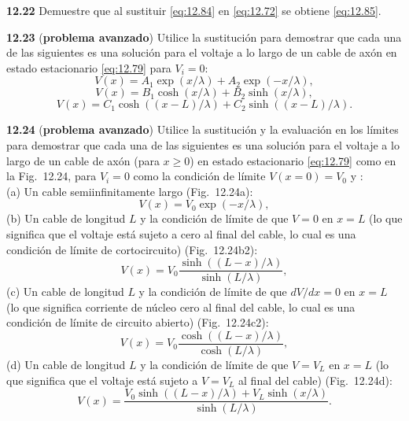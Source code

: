 \documentclass[12pt]{book}
\begin{document}
\noindent \textbf{12.22} Demuestre que al sustituir \eqref{eq:12.84} en \eqref{eq:12.72} se obtiene \eqref{eq:12.85}.

\noindent \textbf{12.23} (\textbf{problema avanzado}) Utilice la sustitución para demostrar que cada una de las siguientes es una solución para el voltaje a lo largo de un cable de axón en estado estacionario \eqref{eq:12.79} para $V_i = 0$:
\begin{equation}
V(x) = A_1 \exp(x/\lambda) + A_2 \exp(-x/\lambda),
\label{eq:12.96}
\end{equation}
\begin{equation}
V(x) = B_1 \cosh(x/\lambda) + B_2 \sinh(x/\lambda),
\label{eq:12.97}
\end{equation}
\begin{equation}
V(x) = C_1 \cosh((x - L)/\lambda) + C_2 \sinh((x - L)/\lambda).
\label{eq:12.98}
\end{equation}

\noindent \textbf{12.24} (\textbf{problema avanzado}) Utilice la sustitución y la evaluación en los límites para demostrar que cada una de las siguientes es una solución para el voltaje a lo largo de un cable de axón (para $x \ge 0$) en estado estacionario \eqref{eq:12.79} como en la Fig.~12.24, para $V_i = 0$ como la condición de límite $V(x = 0) = V_0$ y \cite{26}: \\
(a) Un cable semiinfinitamente largo (Fig.~12.24a):
\begin{equation}
V(x) = V_0 \exp(-x/\lambda),
\label{eq:12.99}
\end{equation}
(b) Un cable de longitud $L$ y la condición de límite de que $V = 0$ en $x = L$ (lo que significa que el voltaje está sujeto a cero al final del cable, lo cual es una condición de límite de cortocircuito) (Fig.~12.24b2):
\begin{equation}
V(x) = V_0 \frac{\sinh((L - x)/\lambda)}{\sinh(L/\lambda)},
\label{eq:12.100}
\end{equation}
(c) Un cable de longitud $L$ y la condición de límite de que $d V/dx = 0$ en $x = L$ (lo que significa corriente de núcleo cero al final del cable, lo cual es una condición de límite de circuito abierto) (Fig.~12.24c2):
\begin{equation}
V(x) = V_0 \frac{\cosh((L - x)/\lambda)}{\cosh(L/\lambda)},
\label{eq:12.101}
\end{equation}
(d) Un cable de longitud $L$ y la condición de límite de que $V = V_L$ en $x = L$ (lo que significa que el voltaje está sujeto a $V = V_L$ al final del cable) (Fig.~12.24d):
\begin{equation}
V(x) = \frac{V_0 \sinh((L - x)/\lambda) + V_L \sinh(x/\lambda)}{\sinh(L/\lambda)}.
\label{eq:12.102}
\end{equation}
\end{document}

